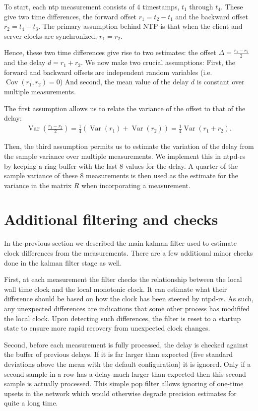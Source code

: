 \documentclass{article}
\DeclareMathOperator{\Var}{Var}
\DeclareMathOperator{\Cov}{Cov}
\begin{document}
To start, each ntp measurement consists of $4$ timestamps, $t_1$ through $t_4$.
These give two time differences, the forward offset $r_1 = t_2 - t_1$ and the backward offset $r_2 = t_4 - t_3$.
The primary assumption behind NTP is that when the client and server clocks are synchronized, $r_1 = r_2$.

Hence, these two time differences give rise to two estimates: the offset $\Delta = \frac{r_1 - r_2}{2}$ and the delay $d = r_1 + r_2$.
We now make two crucial assumptions: 
First, the forward and backward offsets are independent random variables (i.e. $\Cov(r_1, r_2) = 0$)
And second, the mean value of the delay $d$ is constant over multiple measurements.

The first assumption allows us to relate the variance of the offset to that of the delay:
\begin{align}
\Var\left(\frac{r_1-r_2}{2}\right) = \frac{1}{4}\left(\Var(r_1) + \Var(r_2)\right) = \frac{1}{4}\Var(r_1+r_2).
\end{align}

Then, the third assumption permits us to estimate the variation of the delay from the sample variance over multiple measurements.
We implement this in ntpd-rs by keeping a ring buffer with the last 8 values for the delay.
A quarter of the sample variance of these 8 measurements is then used as the estimate for the variance in the matrix $R$ when incorporating a measurement.

\section{Additional filtering and checks}\label{sec:additionalchecks}

In the previous section we described the main kalman filter used to estimate clock differences from the measurements.
There are a few additional minor checks done in the kalman filter stage as well.

First, at each measurement the filter checks the relationship between the local wall time clock and the local monotonic clock.
It can estimate what their difference should be based on how the clock has been steered by ntpd-rs.
As such, any unexpected differences are indications that some other process has modififed the local clock.
Upon detecting such differences, the filter is reset to a startup state to ensure more rapid recovery from unexpected clock changes.

Second, before each measurement is fully processed, the delay is checked against the buffer of previous delays.
If it is far larger than expected (five standard deviations above the mean with the default configuration) it is ignored.
Only if a second sample in a row has a delay much larger than expected then this second sample is actually processed.
This simple pop filter allows ignoring of one-time upsets in the network which would otherwise degrade precision estimates for quite a long time.
\end{document}
